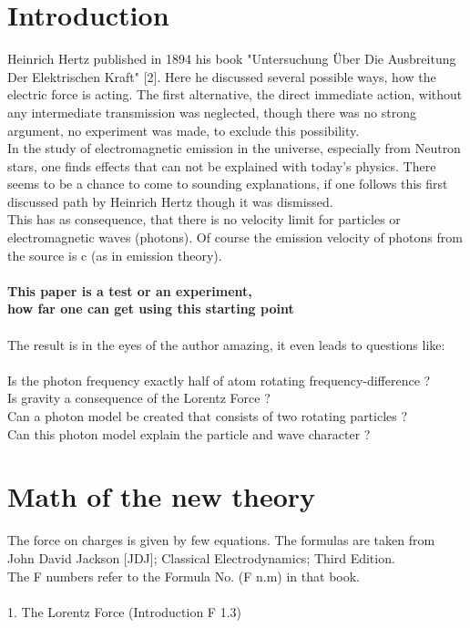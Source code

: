 \documentclass[10pt,titlepage]{article}
\begin{document}
\section{Introduction}
Heinrich Hertz published in 1894 his book "Untersuchung Über Die Ausbreitung Der Elektrischen Kraft" [2]. Here he discussed several possible ways, how the electric force is acting. The first alternative, the direct immediate action, without any intermediate transmission was neglected, though there was no strong argument, no experiment was made, to exclude this possibility. \\
In the study of electromagnetic emission in the universe, especially from Neutron stars, one finds effects that can not be explained with today's physics. There seems to be a chance to come to sounding explanations, if one follows this first discussed path by Heinrich Hertz though it was dismissed.\\
This has as consequence, that there is no velocity limit for particles or electromagnetic waves (photons). Of course the emission velocity of photons from the source is c (as in emission theory).
\\\\
\textbf{This paper is a test or an experiment, 
\\
how far one can get using this starting point }\\\\
The result is in the eyes of the author amazing, it even leads to questions like: \\\\
Is the photon frequency exactly half of atom rotating frequency-difference ?\\
Is gravity a consequence of the Lorentz Force ?\\
Can a photon model be created that consists of two rotating particles ?\\
Can this photon model explain the particle and wave character ?\\


\section{Math of the new theory }

The force on charges is given by few equations.
The formulas are taken from 
\\John David Jackson [JDJ]; Classical Electrodynamics; Third Edition.
\\The F numbers refer to the Formula No. (F n.m) in that book.
\\\\
1. The Lorentz Force (Introduction F 1.3)
\end{document}
